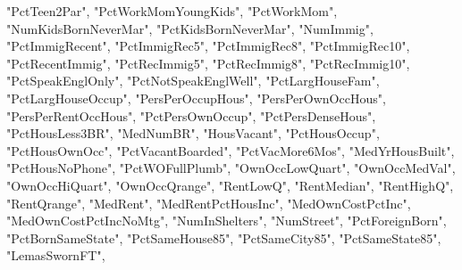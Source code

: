 \documentclass[
  11pt,
]{article}
\newenvironment{Shaded}{}{}
\newcommand{\NormalTok}[1]{#1}
\newcommand{\StringTok}[1]{\textcolor[rgb]{0.25,0.44,0.63}{#1}}
\begin{document}
\begin{Shaded}
\begin{Highlighting}[]
                        \StringTok{"PctTeen2Par"}\NormalTok{, }\StringTok{"PctWorkMomYoungKids"}\NormalTok{, }\StringTok{"PctWorkMom"}\NormalTok{, }
                        \StringTok{"NumKidsBornNeverMar"}\NormalTok{, }\StringTok{"PctKidsBornNeverMar"}\NormalTok{, }\StringTok{"NumImmig"}\NormalTok{, }
                        \StringTok{"PctImmigRecent"}\NormalTok{, }\StringTok{"PctImmigRec5"}\NormalTok{, }\StringTok{"PctImmigRec8"}\NormalTok{, }\StringTok{"PctImmigRec10"}\NormalTok{, }
                        \StringTok{"PctRecentImmig"}\NormalTok{, }\StringTok{"PctRecImmig5"}\NormalTok{, }\StringTok{"PctRecImmig8"}\NormalTok{, }\StringTok{"PctRecImmig10"}\NormalTok{, }
                        \StringTok{"PctSpeakEnglOnly"}\NormalTok{, }\StringTok{"PctNotSpeakEnglWell"}\NormalTok{, }\StringTok{"PctLargHouseFam"}\NormalTok{, }
                        \StringTok{"PctLargHouseOccup"}\NormalTok{, }\StringTok{"PersPerOccupHous"}\NormalTok{, }\StringTok{"PersPerOwnOccHous"}\NormalTok{, }
                        \StringTok{"PersPerRentOccHous"}\NormalTok{, }\StringTok{"PctPersOwnOccup"}\NormalTok{, }\StringTok{"PctPersDenseHous"}\NormalTok{, }
                        \StringTok{"PctHousLess3BR"}\NormalTok{, }\StringTok{"MedNumBR"}\NormalTok{, }\StringTok{"HousVacant"}\NormalTok{, }\StringTok{"PctHousOccup"}\NormalTok{, }
                        \StringTok{"PctHousOwnOcc"}\NormalTok{, }\StringTok{"PctVacantBoarded"}\NormalTok{, }\StringTok{"PctVacMore6Mos"}\NormalTok{, }
                        \StringTok{"MedYrHousBuilt"}\NormalTok{, }\StringTok{"PctHousNoPhone"}\NormalTok{, }\StringTok{"PctWOFullPlumb"}\NormalTok{, }
                        \StringTok{"OwnOccLowQuart"}\NormalTok{, }\StringTok{"OwnOccMedVal"}\NormalTok{, }\StringTok{"OwnOccHiQuart"}\NormalTok{, }
                        \StringTok{"OwnOccQrange"}\NormalTok{, }\StringTok{"RentLowQ"}\NormalTok{, }\StringTok{"RentMedian"}\NormalTok{, }\StringTok{"RentHighQ"}\NormalTok{, }
                        \StringTok{"RentQrange"}\NormalTok{, }\StringTok{"MedRent"}\NormalTok{, }\StringTok{"MedRentPctHousInc"}\NormalTok{, }\StringTok{"MedOwnCostPctInc"}\NormalTok{, }
                        \StringTok{"MedOwnCostPctIncNoMtg"}\NormalTok{, }\StringTok{"NumInShelters"}\NormalTok{, }\StringTok{"NumStreet"}\NormalTok{, }
                        \StringTok{"PctForeignBorn"}\NormalTok{, }\StringTok{"PctBornSameState"}\NormalTok{, }\StringTok{"PctSameHouse85"}\NormalTok{, }
                        \StringTok{"PctSameCity85"}\NormalTok{, }\StringTok{"PctSameState85"}\NormalTok{, }\StringTok{"LemasSwornFT"}\NormalTok{,  }

\end{Highlighting}
\end{Shaded}
\end{document}
